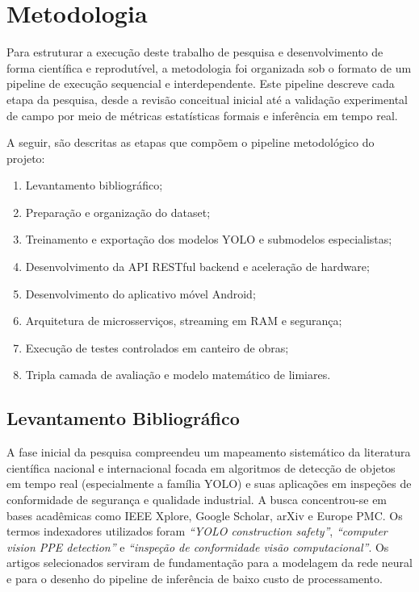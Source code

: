 \chapter{Metodologia}
\label{chap:metodologia}

Para estruturar a execução deste trabalho de pesquisa e desenvolvimento de forma científica e reprodutível, a metodologia foi organizada sob o formato de um pipeline de execução sequencial e interdependente. Este pipeline descreve cada etapa da pesquisa, desde a revisão conceitual inicial até a validação experimental de campo por meio de métricas estatísticas formais e inferência em tempo real.

A seguir, são descritas as etapas que compõem o pipeline metodológico do projeto:
\begin{enumerate}
    \item Levantamento bibliográfico;
    \item Preparação e organização do dataset;
    \item Treinamento e exportação dos modelos YOLO e submodelos especialistas;
    \item Desenvolvimento da API RESTful backend e aceleração de hardware;
    \item Desenvolvimento do aplicativo móvel Android;
    \item Arquitetura de microsserviços, streaming em RAM e segurança;
    \item Execução de testes controlados em canteiro de obras;
    \item Tripla camada de avaliação e modelo matemático de limiares.
\end{enumerate}

\section{Levantamento Bibliográfico}
A fase inicial da pesquisa compreendeu um mapeamento sistemático da literatura científica nacional e internacional focada em algoritmos de detecção de objetos em tempo real (especialmente a família YOLO) e suas aplicações em inspeções de conformidade de segurança e qualidade industrial. A busca concentrou-se em bases acadêmicas como IEEE Xplore, Google Scholar, arXiv e Europe PMC. Os termos indexadores utilizados foram \textit{``YOLO construction safety''}, \textit{``computer vision PPE detection''} e \textit{``inspeção de conformidade visão computacional''}. Os artigos selecionados serviram de fundamentação para a modelagem da rede neural e para o desenho do pipeline de inferência de baixo custo de processamento.

